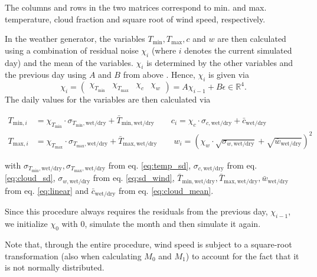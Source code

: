 \documentclass[
11pt, %
english, %
singlespacing, %
headsepline, %
]{MastersDoctoralThesis} %
\begin{document}
\begin{NoHyper}
\begin{refsection}
The columns and rows in the two matrices correspond to min. and max. temperature, cloud fraction and square root of wind speed, respectively.

In the weather generator, the variables $T_\mathrm{min}, T_\mathrm{max}, c$ and $w$ are then calculated using a combination of residual noise $\chi_i$ (where $i$ denotes the current simulated day) and the mean of the variables. $\chi_i$ is determined by the other variables and the previous day using $A$ and $B$ from above \citep{Richardson1981,Matalas1967}. Hence, $\chi_i$ is given via
\begin{equation}
\chi_i = 
\begin{pmatrix} 
\chi_{T_\mathrm{min}} & \chi_{T_\mathrm{max}} & \chi_c & \chi_w
\end{pmatrix} = A\chi_{i-1} + B\epsilon \in \mathbb{R}^4.
\end{equation}
The daily values for the variables are then calculated via

\begin{align}
T_{\mathrm{min},i} &= \chi_{T_\mathrm{min}} \cdot \sigma_{T_\mathrm{min},\mathrm{wet/dry}} + \bar{T}_{\mathrm{min}, \mathrm{wet/dry}} \qquad c_{i} = \chi_{c} \cdot \sigma_{c,\mathrm{wet/dry}} + \bar{c}_{\mathrm{wet/dry}} \\
T_{\mathrm{max},i} &= \chi_{T_\mathrm{max}} \cdot \sigma_{T_\mathrm{max},\mathrm{wet/dry}} + \bar{T}_{\mathrm{max}, \mathrm{wet/dry}} \qquad w_{i} = \left(\chi_{w} \cdot \sqrt{\sigma_{w,\mathrm{wet/dry}}} + \sqrt{\bar{w}_\mathrm{wet/dry}}\right)^2
\end{align}

with $\sigma_{T_\mathrm{min},\mathrm{wet/dry}}, \sigma_{T_\mathrm{max},\mathrm{wet/dry}}$ from eq. \eqref{eq:temp_sd}, $\sigma_{c,\mathrm{wet/dry}}$ from eq. \eqref{eq:cloud_sd}, $\sigma_{w,\mathrm{wet/dry}}$ from eq. \eqref{eq:sd_wind}, $\bar{T}_{\mathrm{min}, \mathrm{wet/dry}}, \bar{T}_{\mathrm{max}, \mathrm{wet/dry}}, \bar{w}_\mathrm{wet/dry}$ from eq. \eqref{eq:linear} and $\bar{c}_{\mathrm{wet/dry}}$ from eq. \eqref{eq:cloud_mean}.

Since this procedure always requires the residuals from the previous day, $\chi_{i-1}$, we initialize $\chi_0$ with 0, simulate the month and then simulate it again.

Note that, through the entire procedure, wind speed is subject to a square-root transformation (also when calculating $M_0$ and $M_1$) to account for the fact that it is not normally distributed.


\end{refsection}
\end{NoHyper}
\end{document}
